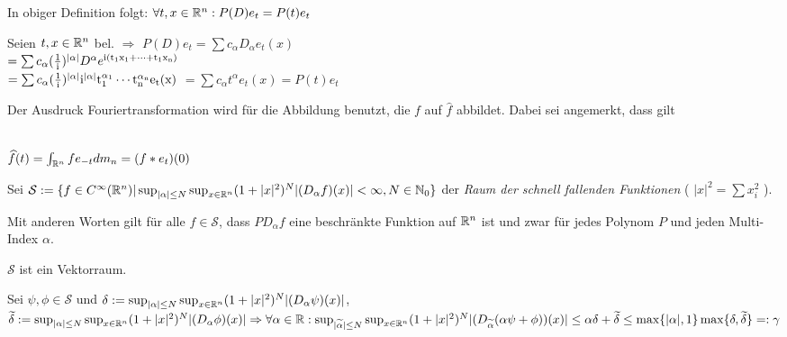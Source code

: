 \documentclass{article}
\def\ie{\rm i}
\begin{document}
\begin{beispiel}
In obiger Definition folgt: $\forall t,x \in \mathbb{R}^n : P(D)e_t = P(t)e_t$ \\
\begin{beweis} 
Seien $t, x \in \mathbb{R}^n$ bel. $\Rightarrow$
 $P(D)e_t = \sum c_{\alpha} D_{\alpha} e_t(x)$ \\
                                       $ = \sum c_{\alpha} (\frac{1}{\ie})^{|\alpha|} D^{\alpha} e^{ \ie( t_1x_1 + \cdots + t_1x_n ) }$ \\
                                       $ = \sum c_{\alpha} (\frac{1}{\ie})^{|\alpha|} \ie^{| \alpha |} t_1^{\alpha_1} \cdots t_n^{\alpha_n} e_t(x)$
                                       $ = \sum c_{\alpha} t^{\alpha} e_t(x) = P(t)e_t  $
\end{beweis}
\end{beispiel}

\begin{beispiel}
Der Ausdruck Fouriertransformation wird für die Abbildung benutzt, die $f$ auf $\hat{f}$ abbildet. Dabei sei angemerkt, dass gilt \\ \\
\centerline{$\widehat{f}(t) = \int_{\mathbb{R}^n}f e_{-t} dm_n = (f * e_t)(0)$ }
\end{beispiel}

\begin{definition} 
Sei $\mathcal{S} := \{f \in C^{\infty}(\mathbb{R}^n) | \sup_{|\alpha| \leq N} \sup _{x \in \mathbb{R}^n} (1+ |x|^2)^N |(D_{\alpha}f)(x)| < \infty, N \in \mathbb{N}_0  \}$
der \emph{Raum der schnell fallenden Funktionen} ( $|x|^2 = \sum x_i^2$ ).
\end{definition}

\begin{bemerkung}
Mit anderen Worten gilt für alle $f \in \mathcal{S}$, dass $P D_\alpha f$ eine beschränkte Funktion auf $\mathbb{R}^n$ ist und zwar für 
jedes Polynom $P$ und jeden Multi-Index $\alpha$.
\end{bemerkung}
\begin{folgerung}
$\mathcal{S}$ ist ein Vektorraum.   
\end{folgerung}

\begin{beweis}
Sei $\psi, \phi \in \mathcal{S}$ und $\delta := \sup_{|\alpha| \leq N} \sup _{x \in \mathbb{R}^n} (1+ |x|^2)^N |(D_{\alpha} \psi)(x)|$,
$\widetilde{\delta} := \sup_{|\alpha| \leq N} \sup _{x \in \mathbb{R}^n} (1+ |x|^2)^N |(D_{\alpha} \phi)(x)| 
\Rightarrow \forall \alpha \in \mathbb{R} : 
\sup_{|\widetilde{\alpha}| \leq N} \sup _{x \in \mathbb{R}^n} (1+ |x|^2)^N |(D_{\widetilde{\alpha}} (\alpha\psi + \phi))(x)| 
\leq \alpha\delta+\widetilde{\delta} \leq \max\{|\alpha|,1\}\max\{\delta, \widetilde{\delta}\} =: \gamma$
\end{beweis}
\end{document}
